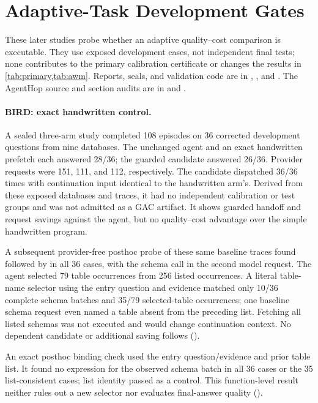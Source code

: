 \section{Adaptive-Task Development Gates}
\label{app:adaptive-gates}

These later studies probe whether an adaptive quality--cost comparison is
executable. They use exposed development cases, not independent final tests;
none contributes to the primary calibration certificate or changes the
results in \cref{tab:primary,tab:awm}. Reports, seals, and validation code are
in ,
, and
. The AgentHop source and
section audits are in  and
.

\paragraph{BIRD: exact handwritten control.}
A sealed three-arm study completed 108 episodes on 36 corrected development
questions from nine databases. The unchanged agent and an exact handwritten
 prefetch each answered 28/36; the guarded candidate
answered 26/36. Provider requests were 151, 111, and 112, respectively.
The candidate dispatched 36/36 times with continuation input identical to
the handwritten arm's. Derived from these exposed databases and traces, it
had no independent calibration or test groups and was not admitted as a GAC
artifact. It shows guarded handoff and request savings against the agent,
but no quality--cost advantage over the simple handwritten program.

A subsequent provider-free posthoc probe of these same baseline traces found
 followed by  in all 36 cases, with the
schema call in the second model request. The agent selected 79 table
occurrences from 256 listed occurrences. A literal table-name selector using
the entry question and evidence matched only 10/36 complete schema batches
and 35/79 selected-table occurrences; one baseline schema request even named
a table absent from the preceding list. Fetching all listed schemas was not
executed and would change continuation context. No dependent candidate or
additional saving follows ().

An exact posthoc  binding check used the entry question/evidence and
prior table list. It found no expression for the observed schema batch in all
36 cases or the 35 list-consistent cases; list identity passed as a control.
This function-level result neither rules out a new selector nor evaluates
final-answer quality ().

